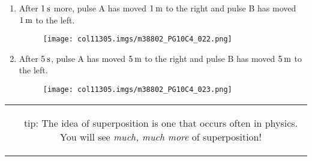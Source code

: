 {\begin{mdframed}[linewidth=4, leftmargin=40, rightmargin=40]
\begin{exercise}
\begin{enumerate}[noitemsep, label=\textbf{Step} \textbf{\arabic*}. ]
\begin{figure}[H]
\begin{center}
    \vspace{.1in}
    \end{center}
 \end{figure}       
      \par 
      \item  
      \label{m38802*id316332}After $1\phantom{\rule{2pt}{0ex}}\mathrm{s}$ more, pulse A has moved $1\phantom{\rule{2pt}{0ex}}\mathrm{m}$ to the right and pulse B has moved $1\phantom{\rule{2pt}{0ex}}\mathrm{m}$ to the left.\par 
      \label{m38802*id316337}
    \setcounter{subfigure}{0}
	\begin{figure}[H] %
    \begin{center}
    \label{m38802*id316340!!!underscore!!!media}\label{m38802*id316340!!!underscore!!!printimage}\texttt{[image: col11305.imgs/m38802\_PG10C4\_022.png]} %
      \vspace{2pt}
    \vspace{.1in}
    \end{center}
 \end{figure}       
      \par 
      \item  
      \label{m38802*id316351}After $5\phantom{\rule{2pt}{0ex}}\mathrm{s}$, pulse A has moved $5\phantom{\rule{2pt}{0ex}}\mathrm{m}$ to the right and pulse B has moved $5\phantom{\rule{2pt}{0ex}}\mathrm{m}$ to the left.\par 
      \label{m38802*id316356}
    \setcounter{subfigure}{0}
	\begin{figure}[H] %
    \begin{center}
    \label{m38802*id316360!!!underscore!!!media}\label{m38802*id316360!!!underscore!!!printimage}\texttt{[image: col11305.imgs/m38802\_PG10C4\_023.png]} %
      \vspace{2pt}
    \vspace{.1in}
    \end{center}
 \end{figure}       
      \par 
      \end{enumerate}
    \end{exercise}
    \end{mdframed}
    }
    \noindent
\label{m38802*notfhsst!!!underscore!!!id635}
\begin{tabular}{cc}
	   \hspace*{-50pt}\raisebox{-8 mm}{ \texttt{[image: col11305.imgs/pstip2.png]}  }& 
	\begin{minipage}{0.85\textwidth}
	\begin{note}
      {tip: }The idea of superposition is one that occurs often in physics. You will see \textsl{much, much more} of superposition!
	\end{note}
	\end{minipage}
	\end{tabular}
	\par
\label{m38802*eip-791}
